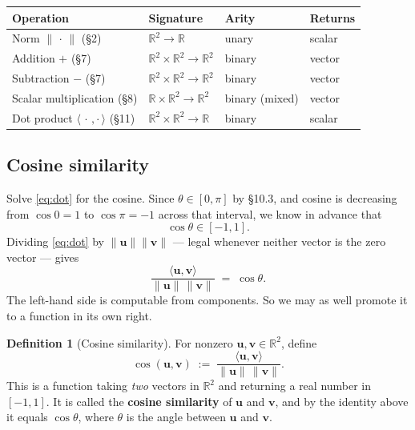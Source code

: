\documentclass[11pt]{article}
\theoremstyle{definition}
\newtheorem{defn}{Definition}
\theoremstyle{remark}
\newcommand{\R}{\mathbb{R}}
\newcommand{\vc}[1]{\mathbf{#1}}
\newcommand{\norm}[1]{\lVert #1\rVert}
\begin{document}
\begin{center}
\renewcommand{\arraystretch}{1.3}
\begin{tabular}{@{}l l l l@{}}
\toprule
\textbf{Operation} & \textbf{Signature} & \textbf{Arity} & \textbf{Returns} \\
\midrule
Norm $\norm{\,\cdot\,}$ (\S2)                & $\R^{2}\to\R$                    & unary            & scalar \\
Addition $+$ (\S7)                           & $\R^{2}\times\R^{2}\to\R^{2}$    & binary           & vector \\
Subtraction $-$ (\S7)                        & $\R^{2}\times\R^{2}\to\R^{2}$    & binary           & vector \\
Scalar multiplication (\S8)                  & $\R\times\R^{2}\to\R^{2}$        & binary (mixed)   & vector \\
Dot product $\langle\,\cdot\,,\cdot\,\rangle$ (\S11) & $\R^{2}\times\R^{2}\to\R$ & binary          & scalar \\
\bottomrule
\end{tabular}
\end{center}

\subsection{Cosine similarity}
Solve \eqref{eq:dot} for the cosine. Since $\theta\in[0,\pi]$ by \S10.3, and
cosine is decreasing from $\cos 0=1$ to $\cos\pi=-1$ across that interval, we
know in advance that
\[
  \cos\theta\in[-1,1].
\]
Dividing \eqref{eq:dot} by $\norm{\vc{u}}\norm{\vc{v}}$ --- legal whenever
neither vector is the zero vector --- gives
\[
  \frac{\langle \vc{u},\vc{v}\rangle}{\norm{\vc{u}}\,\norm{\vc{v}}}
  \;=\; \cos\theta .
\]
The left-hand side is computable from components. So we may as well promote it
to a function in its own right.

\begin{defn}[Cosine similarity]
For nonzero $\vc{u},\vc{v}\in\R^{2}$, define
\[
  \cos(\vc{u},\vc{v})
  \;:=\;
  \frac{\langle \vc{u},\vc{v}\rangle}{\norm{\vc{u}}\,\norm{\vc{v}}} .
\]
This is a function taking \emph{two} vectors in $\R^{2}$ and returning a real
number in $[-1,1]$. It is called the \textbf{cosine similarity} of $\vc{u}$ and
$\vc{v}$, and by the identity above it equals $\cos\theta$, where $\theta$ is
the angle between $\vc{u}$ and $\vc{v}$.
\end{defn}
\end{document}
